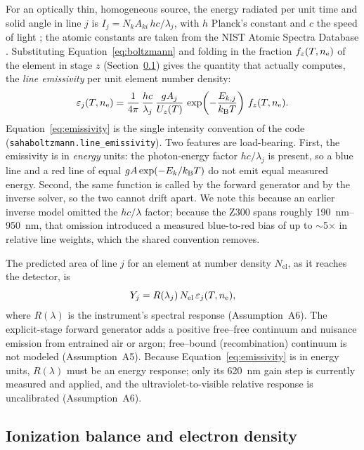 For an optically thin, homogeneous source, the energy radiated per unit time and
solid angle in line $j$ is $I_j = N_k A_{ki}\,hc/\lambda_j$, with $h$ Planck's
constant and $c$ the speed of light \citep{griem1997principles,kunze2009plasma}; the
atomic constants are taken from the NIST Atomic Spectra Database \citep{kramida2023asd}.
Substituting Equation~\eqref{eq:boltzmann} and folding in the fraction $f_z(T,n_{\mathrm{e}})$
of the element in stage $z$ (Section~\ref{sec:theory-saha}) gives the quantity that
\alibz{} actually computes, the \emph{line emissivity} per unit element number
density:
%
\begin{equation}
  \label{eq:emissivity}
  \varepsilon_j(T,n_{\mathrm{e}}) =
    \frac{1}{4\pi}\,\frac{hc}{\lambda_j}\,
    \frac{gA_j}{U_z(T)}\,
    \exp\!\left(-\frac{E_{k,j}}{k_{\mathrm{B}} T}\right)\,
    f_z(T,n_{\mathrm{e}}).
\end{equation}
%
Equation~\eqref{eq:emissivity} is the single intensity convention of the code
(\texttt{sahaboltzmann.line\_emissivity}). Two features are load-bearing. First, the
emissivity is in \emph{energy} units: the photon-energy factor $hc/\lambda_j$ is
present, so a blue line and a red line of equal $gA\exp(-E_k/k_{\mathrm{B}} T)$ do not emit
equal measured energy. Second, the same function is called by the forward generator
and by the inverse solver, so the two cannot drift apart. We note this because an
earlier inverse model omitted the $hc/\lambda$ factor; because the Z300 spans
roughly \SIrange{190}{950}{\nano\meter}, that omission introduced a measured
blue-to-red bias of up to $\sim$\num{5}$\times$ in relative line weights, which the
shared convention removes.

The predicted area of line $j$ for an element at number density $N_\mathrm{el}$,
as it reaches the detector, is
%
\begin{equation}
  \label{eq:forward-line}
  Y_j = R(\lambda_j)\,N_\mathrm{el}\,\varepsilon_j(T,n_{\mathrm{e}}),
\end{equation}
%
where $R(\lambda)$ is the instrument's spectral response (Assumption~A6). The
explicit-stage forward generator adds a positive free--free continuum and nuisance
emission from entrained air or argon; free--bound (recombination) continuum is not
modeled (Assumption~A5). Because Equation~\eqref{eq:emissivity} is in energy units,
$R(\lambda)$ must be an energy response; only its \SI{620}{\nano\meter} gain step is
currently measured and applied, and the ultraviolet-to-visible relative response is
uncalibrated (Assumption~A6).

\subsection{Ionization balance and electron density}
\label{sec:theory-saha}

